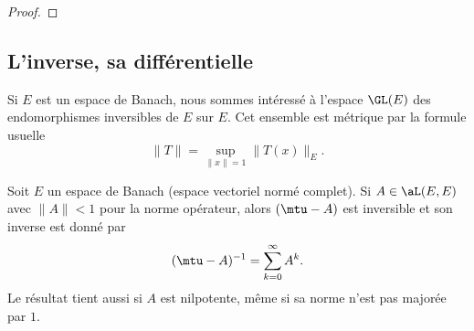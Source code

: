 \begin{proof}
%
%
\end{proof}

\subsection{L'inverse, sa différentielle}

Si \( E\) est un espace de Banach, nous sommes intéressé à l'espace \( \GL(E)\) des endomorphismes inversibles de \( E\) sur \( E\). Cet ensemble est métrique par la formule usuelle
\begin{equation}
    \| T \|=\sup_{\| x \|=1}\| T(x) \|_E.
\end{equation}

\begin{proposition}     \label{PropQAjqUNp}
    Soit \( E\) un espace de Banach (espace vectoriel normé complet). Si \( A\in\aL(E,E)\) avec \( \| A \|<1\) pour la norme opérateur, alors \( (\mtu-A)\) est inversible et son inverse est donné par
    \begin{equation}
        (\mtu-A)^{-1}=\sum_{k=0}^{\infty}A^k.
    \end{equation}
    Le résultat tient aussi si \( A\) est nilpotente, même si sa norme n'est pas majorée par \( 1\).
\end{proposition}

